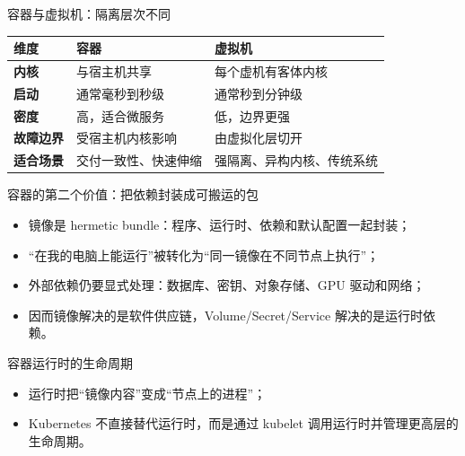 \documentclass[UTF8,fontset=none,aspectratio=169,10pt]{beamer}
\begin{document}
\begin{frame}{容器与虚拟机：隔离层次不同}
\begin{tabularx}{\linewidth}{>{\bfseries}p{2.7cm}XX}
\toprule
维度 & 容器 & 虚拟机 \\
\midrule
内核 & 与宿主机共享 & 每个虚机有客体内核 \\
启动 & 通常毫秒到秒级 & 通常秒到分钟级 \\
密度 & 高，适合微服务 & 低，边界更强 \\
故障边界 & 受宿主机内核影响 & 由虚拟化层切开 \\
适合场景 & 交付一致性、快速伸缩 & 强隔离、异构内核、传统系统 \\
\bottomrule
\end{tabularx}
\vfill
{}
\end{frame}

\begin{frame}{容器的第二个价值：把依赖封装成可搬运的包}
\begin{itemize}
  \item 镜像是 hermetic bundle：程序、运行时、依赖和默认配置一起封装；
  \item “在我的电脑上能运行”被转化为“同一镜像在不同节点上执行”；
  \item 外部依赖仍要显式处理：数据库、密钥、对象存储、GPU 驱动和网络；
  \item 因而镜像解决的是软件供应链，Volume/Secret/Service 解决的是运行时依赖。
\end{itemize}
\vfill
{}
\end{frame}

\begin{frame}{容器运行时的生命周期}
\begin{center}
\end{center}
\begin{itemize}
  \item 运行时把“镜像内容”变成“节点上的进程”；
  \item Kubernetes 不直接替代运行时，而是通过 kubelet 调用运行时并管理更高层的生命周期。
\end{itemize}
\end{frame}
\end{document}
